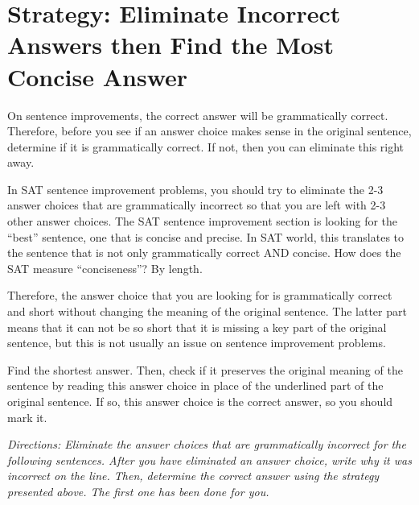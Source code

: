 \section{Strategy: Eliminate Incorrect Answers then Find the Most Concise Answer}

On sentence improvements, the correct answer will be grammatically correct. Therefore, before
you see if an answer choice makes sense in the original sentence, determine if it is grammatically
correct. If not, then you can eliminate this right away.

In SAT sentence improvement problems, you should try to eliminate the 2-3 answer choices that are grammatically incorrect so that you are left with 2-3 other answer choices. The SAT sentence improvement section is looking for the ``best'' sentence, one that is concise and precise. In SAT world, this translates to the sentence that is not only grammatically correct AND concise. How does the SAT measure ``conciseness''? By length.

\bigskip
Therefore, the answer choice that you are looking for is grammatically correct and short without changing the meaning of the original sentence. The latter part means that it can not be so short that it is missing a key part of the original sentence,
but this is not usually an issue on sentence improvement problems.

\bigskip
Find the shortest answer. Then, check if it preserves the original meaning of the sentence by reading this answer choice in place of the underlined part of the original sentence. If so, this answer choice is the correct answer, so you should mark it.

\bigskip
\textit{Directions: Eliminate the answer choices that are grammatically incorrect for the following sentences. After you have eliminated an answer choice, write why it was incorrect on the line. Then, determine the correct answer using the strategy presented above. The first one has been done for you.}


